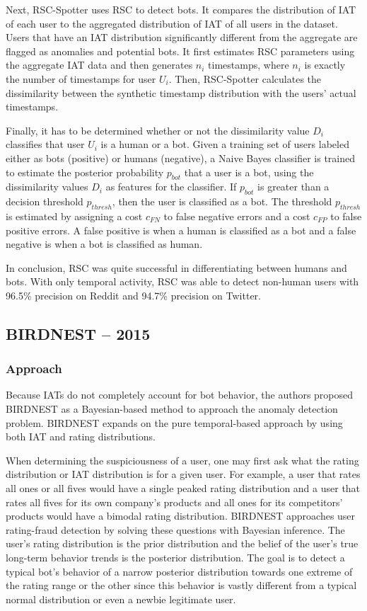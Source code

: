 \documentclass[11pt, oneside]{article}   	%
\begin{document}
\quad Next, RSC-Spotter uses RSC to detect bots.
It compares the distribution of IAT of each user to the aggregated distribution of IAT of all users in the dataset.
Users that have an IAT distribution significantly different from the aggregate are flagged as anomalies and potential bots.
It first estimates RSC parameters using the aggregate IAT data and then generates $n_i$ timestamps, where $n_i$ is exactly the number of timestamps for user $U_i$.
Then, RSC-Spotter calculates the dissimilarity between the synthetic timestamp distribution with the users' actual timestamps.

\quad Finally, it has to be determined whether or not the dissimilarity value $D_i$ classifies that user $U_i$ is a human or a bot.
Given a training set of users labeled either as bots (positive) or humans (negative), a Naive Bayes classifier is trained to estimate the posterior probability $p_{bot}$ that a user is a bot, using the dissimilarity values $D_i$ as features for the classifier.
If $p_{bot}$ is greater than a decision threshold $p_{thresh}$, then the user is classified as a bot.
The threshold $p_{thresh}$ is estimated by assigning a cost $c_{FN}$ to false negative errors and a cost $c_{FP}$ to false positive errors.
A false positive is when a human is classified as a bot and a false negative is when a bot is classified as human.

\quad In conclusion, RSC was quite successful in differentiating between humans and bots.
With only temporal activity, RSC was able to detect non-human users with 96.5\% precision on Reddit and 94.7\% precision on Twitter.

\subsection*{BIRDNEST -- 2015}

\subsubsection*{Approach}

\quad Because IATs do not completely account for bot behavior, the authors proposed BIRDNEST as a Bayesian-based method to approach the anomaly detection problem. 
BIRDNEST expands on the pure temporal-based approach by using both IAT and rating distributions.

\quad When determining the suspiciousness of a user, one may first ask what the rating distribution or IAT distribution is for a given user.
For example, a user that rates all ones or all fives would have a single peaked rating distribution and a user that rates all fives for its own company's products and all ones for its competitors' products would have a bimodal rating distribution.
BIRDNEST approaches user rating-fraud detection by solving these questions with Bayesian inference.
The user's rating distribution is the prior distribution and the belief of the user's true long-term behavior trends is the posterior distribution.
The goal is to detect a typical bot's behavior of a narrow posterior distribution towards one extreme of the rating range or the other since this behavior is vastly different from a typical normal distribution or even a newbie legitimate user.
\end{document}
